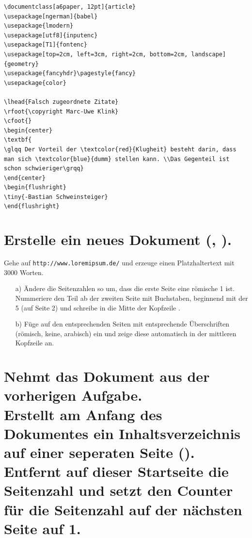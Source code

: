 \begin{Antwort}
\begin{lstlisting}[style=latex]
\documentclass[a6paper, 12pt]{article}
\usepackage[ngerman]{babel}
\usepackage{lmodern}
\usepackage[utf8]{inputenc}
\usepackage[T1]{fontenc}
\usepackage[top=2cm, left=3cm, right=2cm, bottom=2cm, landscape]{geometry}
\usepackage{fancyhdr}\pagestyle{fancy}
\usepackage{color}

\lhead{Falsch zugeordnete Zitate}
\rfoot{\copyright Marc-Uwe Klink}
\cfoot{}
\begin{center}
\textbf{
\glqq Der Vorteil der \textcolor{red}{Klugheit} besteht darin, dass man sich \textcolor{blue}{dumm} stellen kann. \\Das Gegenteil ist schon schwieriger\grqq}
\end{center}
\begin{flushright}
\tiny{-Bastian Schweinsteiger}
\end{flushright}

\end{lstlisting}

\end{Antwort}


\section{Erstelle ein neues Dokument (, ).} 
Gehe auf \texttt{http://www.loremipsum.de/} und erzeuge einen Platzhaltertext mit 3000 Worten. 
\begin{enumerate}
\item[a)] Ändere die Seitenzahlen so um, dass die erste Seite eine römische 1 ist.\\
Nummeriere den Teil ab der zweiten Seite mit Buchstaben, beginnend mit der 5 (auf Seite 2) und schreibe in die Mitte der Kopfzeile .
 
\item[b)] Füge auf den entsprechenden Seiten mit  entsprechende Überschriften (römisch, keine, arabisch) ein und zeige diese automatisch in der mittleren Kopfzeile an.

\end{enumerate}

\section{Nehmt das Dokument aus der vorherigen Aufgabe. \\
Erstellt am  Anfang des Dokumentes ein Inhaltsverzeichnis auf einer seperaten Seite (). Entfernt auf dieser Startseite die Seitenzahl und setzt den Counter für die Seitenzahl auf der nächsten Seite auf 1.}

